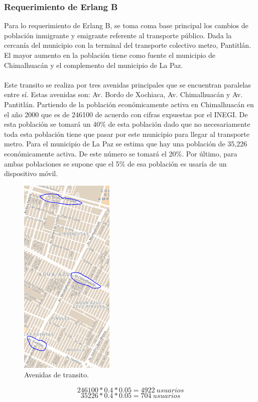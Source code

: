 \documentclass[11pt,letterpaper]{article}
\begin{document}
\subsubsection{Requerimiento de Erlang B}
Para lo requerimiento de Erlang B, se toma coma base principal los cambios de población 
inmigrante y emigrante referente al transporte público. Dada la cercanía del municipio 
con la terminal del transporte colectivo metro, Pantitlán. El mayor aumento en la 
población tiene como fuente el municipio de Chimalhuacán y el complemento del municipio 
de La Paz. 
\\ \\ 
Este transito se realiza por tres avenidas principales que se encuentran paralelas entre 
sí. Estas avenidas son: Av. Bordo de Xochiaca, Av. Chimalhuacán y Av. Pantitlán. 
Partiendo de la población económicamente activa en Chimalhuacán en el año 2000 que es de 
246100 de acuerdo con cifras expuestas por el INEGI. De esta población se tomará un 40\% 
de esta población dado que no necesariamente toda esta población tiene que pasar por 
este municipio para llegar al transporte metro. Para el municipio de La Paz se estima 
que hay una población de 35,226 económicamente activa. De este número se tomará el 20\%. 
Por último, para ambas poblaciones se supone que el 5\% de esa población es usaría de un 
dispositivo móvil.
\begin{figure}[ht]
    \centering
    \includegraphics[width=0.4\textwidth]{imagenes/t35.png}
    \caption{Avenidas de transito.}
\end{figure}
\begin{equation}
    246100*0.4*0.05=4922 \ usuarios
\end{equation}
\begin{equation}
    35226*0.4*0.05=704 \ usuarios
\end{equation}
\end{document}
